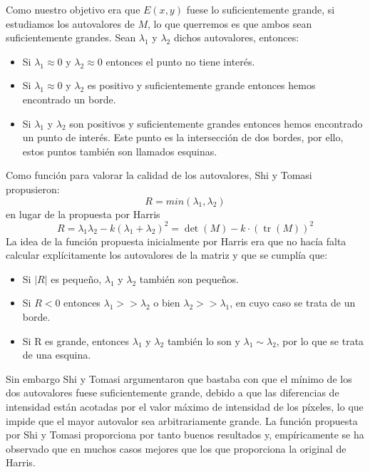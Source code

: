 \documentclass[a4paper,openright, 12pt]{book}
\begin{document}
Como nuestro objetivo era que $E(x,y)$ fuese lo suficientemente grande, si estudiamos los autovalores de $M$, lo que querremos es que ambos sean suficientemente grandes.
Sean $\lambda_1$ y $\lambda_2$ dichos autovalores, entonces:
\begin{itemize}
\item Si  $ \lambda_1 \approx 0 $ y $\lambda_2 \approx 0 $ entonces el punto no tiene interés.
\item Si  $ \lambda_1 \approx 0 $ y $\lambda_2 $ es positivo y suficientemente grande entonces hemos encontrado un borde.
\item Si  $ \lambda_1 $ y $\lambda_2 $ son positivos y suficientemente grandes entonces hemos encontrado un punto de interés. Este punto es la intersección de dos bordes, por ello, estos puntos también son llamados esquinas.
\end{itemize}
Como función para valorar la calidad de los autovalores, Shi y Tomasi \cite{shiandtomasi} propusieron:
\begin{equation*}
R = min(\lambda_1, \lambda_2)
\end{equation*}
en lugar de la propuesta por Harris\cite{harris88}
\begin{equation*}
R = \lambda_1 \lambda_2 - k(\lambda_1 + \lambda_2)^2 = \operatorname{det}(M) - k\cdot(\operatorname{tr}(M))^2
\end{equation*}
La idea de la función propuesta inicialmente por Harris era que no hacía falta calcular explícitamente los autovalores de la matriz y que se cumplía que:
\begin{itemize}
 \item Si $|R|$ es pequeño, $\lambda_1$ y $\lambda_2$ también son pequeños.
 \item Si $R<0$ entonces $\lambda_1>>\lambda_2$ o bien $\lambda_2>>\lambda_1$, en cuyo caso se trata de un borde.
 \item Si R es grande, entonces  $\lambda_1$ y $\lambda_2$ también lo son y $\lambda_1 \sim \lambda_2$, por lo que se trata de una esquina.
 \end{itemize}
 
Sin embargo Shi y Tomasi argumentaron que bastaba con que el mínimo de los dos autovalores fuese suficientemente grande, debido a que las diferencias de intensidad están acotadas por el valor máximo de intensidad de los píxeles, lo que impide que el mayor autovalor sea arbitrariamente grande.
La función propuesta por Shi y Tomasi proporciona por tanto buenos resultados y, empíricamente se ha observado que en muchos casos mejores que los que proporciona la original de Harris.
\end{document}
